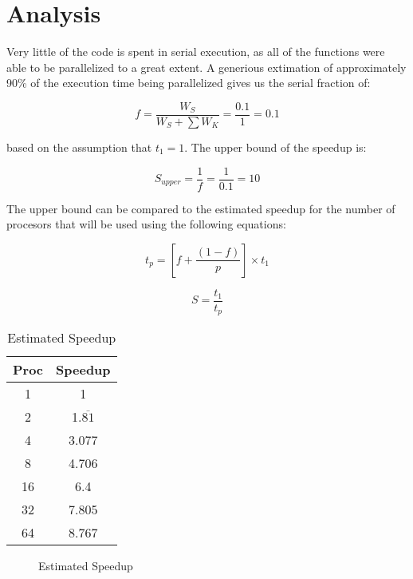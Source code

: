 \documentclass{article}
\begin{document}
  \section{Analysis}

  Very little of the code is spent in serial execution, as all of the functions
  were able to be parallelized to a great extent. A generious extimation of
  approximately 90\% of the execution time being parallelized gives us the
  serial fraction of:

  \[ f = \frac{W_S}{W_S + \sum W_K} = \frac{0.1}{1} = 0.1 \]

  based on the assumption that \( t_1 = 1 \). The upper bound of the speedup 
  is:

  \[ S_{upper} = \frac{1}{f} = \frac{1}{0.1} = 10 \]

  The upper bound can be compared to the estimated speedup for the number of
  procesors that will be used using the following equations:

  \[ t_p = \left[ f + \frac{\left( 1 - f \right)}{p} \right] \times t_1 \]

  \[ S = \frac{t_1}{t_p} \]

  \begin{table}[H]
    \centering

    \begin{tabular}{|c|c|}
      \hline
      Proc & Speedup \\
      \hline
      1  & 1                  \\
      2  & 1.$\overline{81}$  \\
      4  & 3.077              \\
      8  & 4.706              \\
      16 & 6.4                \\
      32 & 7.805              \\
      64 & 8.767              \\
      \hline
    \end{tabular}
    \caption{Estimated Speedup}
    \label{tab:estspeeduptab}
  \end{table}

  \begin{figure}[H]
    \centering

    \caption{Estimated Speedup}
    \label{fig:estspeedupfig}
  \end{figure}
\end{document}
